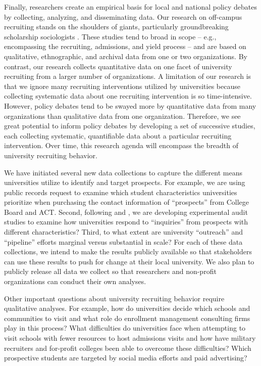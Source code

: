 \documentclass[twoside]{article}
\begin{document}
Finally, researchers create an empirical basis for local and national policy debates by collecting, analyzing, and disseminating data.  Our research on off-campus recruiting stands on the shoulders of giants, particularly groundbreaking scholarship sociologists \citep[e.g., ][]{RN3519,RN4407,RN4324}. These studies tend to broad in scope -- e.g., encompassing the recruiting, admissions, and yield process -- and are based on qualitative, ethnographic, and archival data from one or two organizations. By contrast, our research collects quantitative data on one facet of university recruiting from a larger number of organizations. A limitation of our research is that we ignore many recruiting interventions utilized by universities because collecting systematic data about one recruiting intervention is so time-intensive. However, policy debates tend to be swayed more by quantitative data from many organizations than qualitative data from one organization. Therefore, we see great potential to inform policy debates by developing a set of successive studies, each collecting systematic, quantifiable data about a particular recruiting intervention. Over time, this research agenda will encompass the breadth of university recruiting behavior.

We have initiated several new data collections to capture the different means universities utilize to identify and target prospects.  For example, we are using public records request to examine which student characteristics universities prioritize when purchasing the contact information of ``prospects'' from College Board and ACT.  Second, following \cite{RN4331} and \cite{RN4360}, we are developing experimental audit studies to examine how universities respond to ``inquiries'' from prospects with different characteristics? Third, to what extent are university ``outreach'' and ``pipeline'' efforts marginal versus substantial in scale? For each of these data collections, we intend to make the results publicly available so that stakeholders can use these results to push for change at their local university. We also plan to publicly release all data we collect so that researchers and non-profit organizations can conduct their own analyses.

Other important questions about university recruiting behavior require qualitative analyses. For example, how do universities decide which schools and communities to visit and what role do enrollment management consulting firms play in this process? What difficulties do universities face when attempting to visit schools with fewer resources to host admissions visits and how have military recruiters and for-profit colleges been able to overcome these difficulties? Which prospective students are targeted by social media efforts and paid advertising? 
\end{document}
